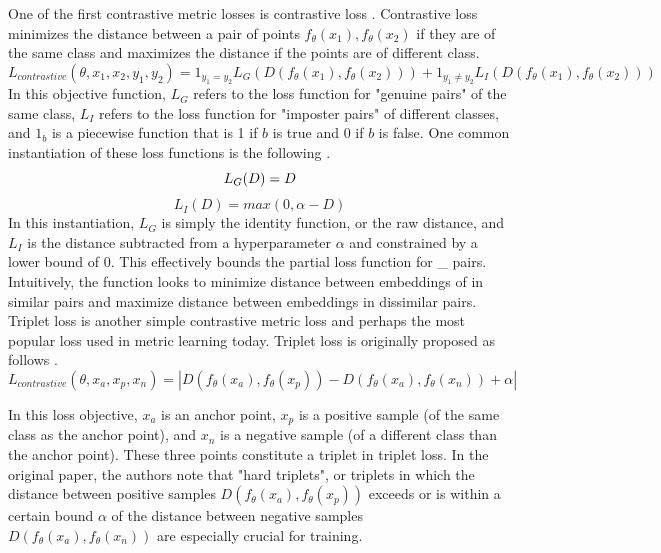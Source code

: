 \documentclass[./dissertation.tex]{subfiles}
\begin{document}
    One of the first contrastive metric losses is contrastive loss \cite{chopra2005learning}. Contrastive loss minimizes the distance between a pair of points $f_{\theta}(x_{1}), f_{\theta}(x_{2})$ if they are of the same class and maximizes the distance if the points are of different class. \\ 
    \begin{equation*}
            L_{contrastive}(\theta, x_{1}, x_{2}, y_{1}, y_{2})
            = 1_{y_{1} = y_{2}}L_{G}(D(f_{\theta}(x_{1}), f_{\theta}(x_{2})))
            + 1_{y_{1} \neq y_{2}}L_{I}(D(f_{\theta}(x_{1}), f_{\theta}(x_{2})))
    \end{equation*}
    In this objective function, $L_{G}$ refers to the loss function for "genuine pairs" of the same class, $L_{I}$ refers to the loss function for "imposter pairs" of different classes, and $1_{b}$ is a piecewise function that is 1 if $b$ is true and 0 if $b$ is false. One common instantiation of these loss functions is the following \cite{weng2021contrastive}.
    \begin{equation*}
            L_{G}(D) = D \\
    \end{equation*}  
        \begin{equation*}
            L_{I}(D) = max(0, \alpha - D) 
    \end{equation*}  
    In this instantiation, $L_{G}$ is simply the identity function, or the raw distance, and $L_{I}$ is the distance subtracted from a hyperparameter $\alpha$ and constrained by a lower bound of 0. This effectively bounds the partial loss function for \_ pairs. Intuitively, the function looks to minimize distance between embeddings of in similar pairs and maximize distance between embeddings in dissimilar pairs. \\
    
    Triplet loss is another simple contrastive metric loss and perhaps the most popular loss used in metric learning today. Triplet loss is originally proposed as follows \cite{schroff2015facenet}. 
    \begin{equation*}
    L_{contrastive}(\theta, x_{a}, x_{p}, x_{n}) =
    |D(f_{\theta}(x_{a}), f_{\theta}(x_{p})) - D(f_{\theta}(x_{a}), f_{\theta}(x_{n})) + \alpha|
    \end{equation*} 
    
    In this loss objective, $x_{a}$ is an anchor point, $x_{p}$ is a positive sample (of the same class as the anchor point), and  $x_{n}$ is a negative sample (of a different class than the anchor point). These three points constitute a triplet in triplet loss. In the original paper, the authors note that "hard triplets", or triplets in which the distance between positive samples $D(f_{\theta}(x_{a}), f_{\theta}(x_{p}))$ exceeds or is within a certain bound $\alpha$ of the distance between negative samples $D(f_{\theta}(x_{a}), f_{\theta}(x_{n}))$ are especially crucial for training. 
    
\end{document}
